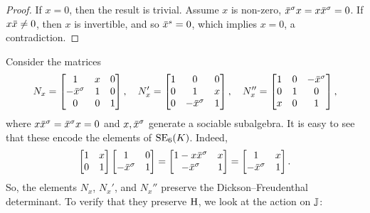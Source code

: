 \begin{proof}
	If $x = 0$, then the result is trivial. Assume $x$ is non-zero, $\ovx^{\s} x = x\ovx^{\s} = 0$.
	If $x \mathord{\mbox{\hspace*{0pt}}\,\overline{\!x\!\!\;}\!\:}\mbox{\hspace*{0pt}} \neq 0$, then $x$ is invertible, and so $\mathord{\mbox{\hspace*{0pt}}\,\overline{\!x\!\!\;}\!\:}\mbox{\hspace*{0pt}}^{s} = 0$, which implies $x = 0$, a 
	contradiction.
\end{proof}

Consider the matrices
\begin{equation}
	N_x = \begin{bmatrix}
		1 & x & 0 \\
		-\ovx^{\s} & 1 & 0 \\
		0 & 0 & 1
	\end{bmatrix},\quad
	N_x' = \begin{bmatrix}
		1 & 0 & 0 \\
		0 & 1 & x \\
		0 & -\ovx^{\s} & 1
	\end{bmatrix},\quad
	N_x'' = \begin{bmatrix}
		1 & 0 & -\ovx^{\s} \\
		0 & 1 & 0 \\
		x & 0 & 1
	\end{bmatrix},
\end{equation}
where $x\ovx^{\s} = \ovx^{\s}x = 0$ and $x,\mathord{\mbox{\hspace*{0pt}}\,\overline{\!x\!\!\;}\!\:}\mbox{\hspace*{0pt}}^{\sigma}$ generate a sociable subalgebra. 
It is easy to see that these encode the elements of $\mathrm{SE}_6(K)$. Indeed,
\begin{equation}
	\begin{bmatrix}
		1 & x \\
		0 & 1
	\end{bmatrix}
	\begin{bmatrix}
		1 & 0 \\
		-\ovx ^{\s} & 1
	\end{bmatrix} = 
	\begin{bmatrix}
		1 - x\ovx ^{\s} & x \\
		-\ovx ^{\s} & 1 
	\end{bmatrix} = 
	\begin{bmatrix}
		1 & x \\
		-\ovx ^{\s} & 1
	\end{bmatrix}.
\end{equation}
So, the elements $N_x$, $N_x'$, and $N_x''$ preserve the Dickson--Freudenthal determinant. 
To verify that they preserve $\mathrm{H}$, we look at the action on $\mathbb{J}$:
